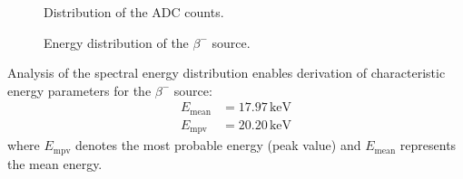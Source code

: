 \begin{figure}[H]
	\centering
	\caption{Distribution of the ADC counts.}
	\label{fig:ACD}
\end{figure}

\begin{figure}[H]
	\centering
	\caption{Energy distribution of the $\beta^{-}$ source.}
	\label{fig:energydistrib}
\end{figure}

Analysis of the spectral energy distribution enables derivation of characteristic energy parameters for the $\beta^{-}$ source:
\begin{align*}
E_{\text{mean}} &= 17.97  \hspace{2pt}\text{keV} \\
E_{\text{mpv}} &= 20.20  \hspace{2pt}\text{keV}
\end{align*}
where $E_{\text{mpv}}$ denotes the most probable energy (peak value) and $E_{\text{mean}}$ represents the mean energy.
